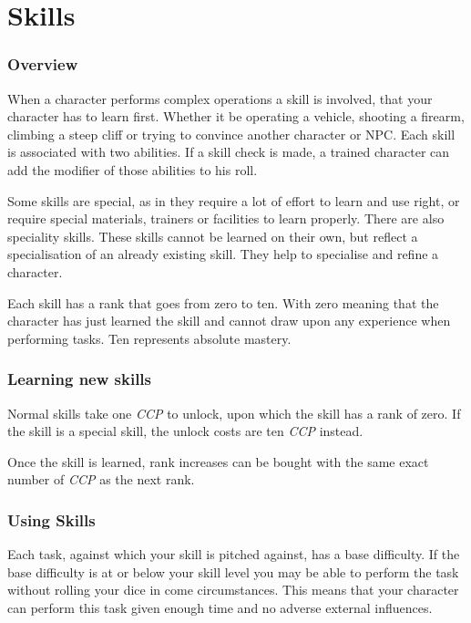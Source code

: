 \newcommand{\skill}[1]{\emph{#1}}

\chapter{Skills}

\subsection{Overview}

When a character performs complex operations a skill is involved, that your
character has to learn first. Whether it be operating a vehicle, shooting a
firearm, climbing a steep cliff or trying to convince another character or
NPC. Each skill is associated with two abilities. If a skill check is made,
a trained character can add the modifier of those abilities to his roll.

Some skills are special, as in they require a lot of effort to learn and use
right, or require special materials, trainers or facilities to learn properly.
There are also speciality skills. These skills cannot be learned on their own,
but reflect a specialisation of an already existing skill. They help to
specialise and refine a character.

Each skill has a rank that goes from zero to ten. With zero meaning that the
character has just learned the skill and cannot draw upon any experience when
performing tasks. Ten represents absolute mastery.

\subsection{Learning new skills}

Normal skills take one \emph{CCP} to unlock, upon which the skill has a rank
of zero. If the skill is a special skill, the unlock costs are ten \emph{CCP}
instead.

Once the skill is learned, rank increases can be bought with the same exact
number of \emph{CCP} as the next rank.

\subsection{Using Skills}

Each task, against which your skill is pitched against, has a base difficulty.
If the base difficulty is at or below your skill level you may be able to
perform the task without rolling your dice in come circumstances. This means
that your character can perform this task given enough time and no adverse
external influences.

